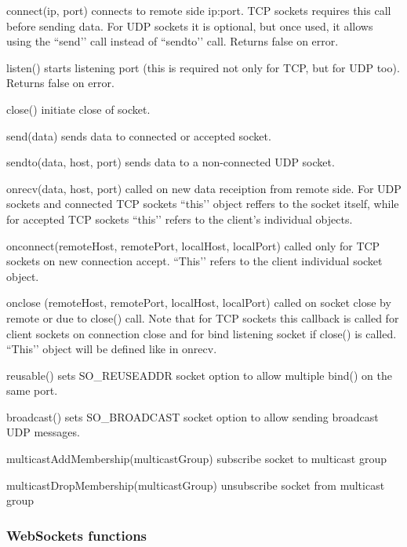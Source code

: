 \begin{itemize}
{\item connect(ip, port) connects to remote side ip:port. TCP sockets requires this call before sending data. For UDP sockets it is optional, but once used, it allows using the ``send’’ call instead of ``sendto’’ call. Returns false on error.
\item listen() starts listening port (this is required not only for TCP, but for UDP too). Returns false on error.
\item close() initiate close of socket.
\item send(data) sends data to connected or accepted socket.
\item sendto(data, host, port) sends data to a non-connected UDP socket.
\item onrecv(data, host, port) called on new data receiption from remote side. For UDP sockets and connected TCP sockets ``this’’ object reffers to the socket itself, while for accepted TCP sockets ``this’’ refers to the client's individual objects.
\item onconnect(remoteHost, remotePort, localHost, localPort) called only for TCP sockets on new connection accept. ``This’’ refers to the client individual socket object.
\item onclose (remoteHost, remotePort, localHost, localPort) called on socket close by remote or due to close() call. Note that for TCP sockets this callback is called for client sockets on connection close and for bind listening socket if close() is called. ``This’’ object will be defined like in onrecv.
\item reusable() sets SO\_REUSEADDR socket option to allow multiple bind() on the same port.
\item broadcast() sets SO\_BROADCAST socket option to allow sending broadcast UDP messages.
\item multicastAddMembership(multicastGroup) subscribe socket to multicast group
\item multicastDropMembership(multicastGroup) unsubscribe socket from multicast group}
\end{itemize}

\subsubsection{WebSockets functions}


